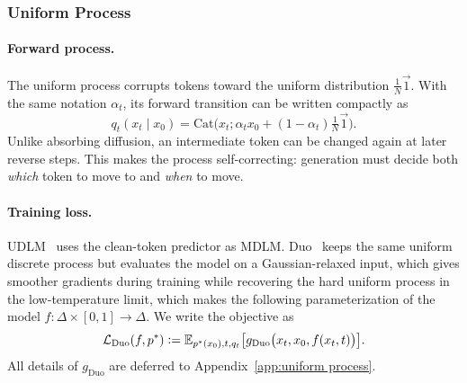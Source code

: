\subsubsection{Uniform Process}
\label{sec:uniform process duo}
    \paragraph{Forward process.}
    The uniform process corrupts tokens toward the uniform distribution $\frac{1}{N}\vec{1}$. With the same notation $\alpha_t$, its forward transition can be written compactly as
    \[
        q_t(x_t \mid x_0)
        = \mathrm{Cat}\bigl(x_t; \alpha_t x_0 + (1-\alpha_t)\tfrac{1}{N}\vec{1}\bigr).
    \]
    Unlike absorbing diffusion, an intermediate token can be changed again at later reverse steps. This makes the process self-correcting: generation must decide both \textit{which} token to move to and \textit{when} to move.

    \paragraph{Training loss.}
    UDLM~\citep{schiff2024discreteguidance} uses the clean-token predictor as MDLM. Duo~\citep{sahoo2025the} keeps the same uniform discrete process but evaluates the model on a Gaussian-relaxed input, which gives smoother gradients during training while recovering the hard uniform process in the low-temperature limit, which makes the following parameterization of the model $f\colon \Delta \times [0,1]\to\Delta$. We write the objective as
    \begin{equation}
    \label{eq:duo loss}
    \mathcal{L}_{\text{Duo}}(f,p^*)
    \vcentcolon=
      \textstyle
    \mathbb{E}_{p^*(x_0), t, q_t}
      \bigl[
        g_{\mathrm{Duo}}\bigl(x_t ,x_0,f(x_t,t)\bigr)
      \bigr].
    \end{equation}
    All details of $g_{\mathrm{Duo}}$ are deferred to Appendix~\ref{app:uniform process}.


